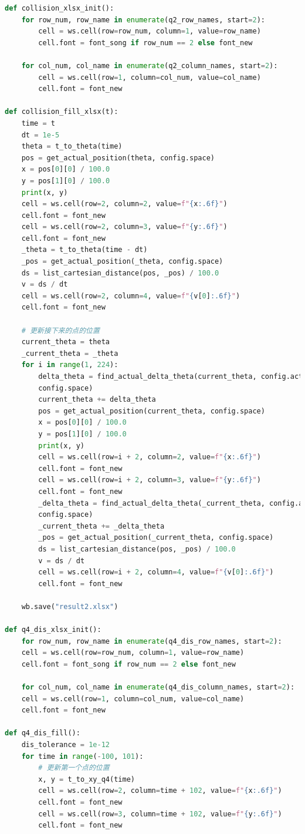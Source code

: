 \documentclass[a4paper]{article}
\begin{document}
\begin{lstlisting}[language=python,columns=fullflexible,frame=shadowbox]
def collision_xlsx_init():
	for row_num, row_name in enumerate(q2_row_names, start=2):
		cell = ws.cell(row=row_num, column=1, value=row_name)
		cell.font = font_song if row_num == 2 else font_new

	for col_num, col_name in enumerate(q2_column_names, start=2):
		cell = ws.cell(row=1, column=col_num, value=col_name)
		cell.font = font_new

def collision_fill_xlsx(t):
	time = t
	dt = 1e-5
	theta = t_to_theta(time)
	pos = get_actual_position(theta, config.space)
	x = pos[0][0] / 100.0
	y = pos[1][0] / 100.0
	print(x, y)
	cell = ws.cell(row=2, column=2, value=f"{x:.6f}")
	cell.font = font_new
	cell = ws.cell(row=2, column=3, value=f"{y:.6f}")
	cell.font = font_new
	_theta = t_to_theta(time - dt)
	_pos = get_actual_position(_theta, config.space)
	ds = list_cartesian_distance(pos, _pos) / 100.0
	v = ds / dt
	cell = ws.cell(row=2, column=4, value=f"{v[0]:.6f}")
	cell.font = font_new

	# 更新接下来的点的位置
	current_theta = theta
	_current_theta = _theta
	for i in range(1, 224):
		delta_theta = find_actual_delta_theta(current_theta, config.actual_fixed_distances[0 if i == 1 else 1],
		config.space)
		current_theta += delta_theta
		pos = get_actual_position(current_theta, config.space)
		x = pos[0][0] / 100.0
		y = pos[1][0] / 100.0
		print(x, y)
		cell = ws.cell(row=i + 2, column=2, value=f"{x:.6f}")
		cell.font = font_new
		cell = ws.cell(row=i + 2, column=3, value=f"{y:.6f}")
		cell.font = font_new
		_delta_theta = find_actual_delta_theta(_current_theta, config.actual_fixed_distances[0 if i == 1 else 1],
		config.space)
		_current_theta += _delta_theta
		_pos = get_actual_position(_current_theta, config.space)
		ds = list_cartesian_distance(pos, _pos) / 100.0
		v = ds / dt
		cell = ws.cell(row=i + 2, column=4, value=f"{v[0]:.6f}")
		cell.font = font_new
		
	wb.save("result2.xlsx")

def q4_dis_xlsx_init():
	for row_num, row_name in enumerate(q4_dis_row_names, start=2):
	cell = ws.cell(row=row_num, column=1, value=row_name)
	cell.font = font_song if row_num == 2 else font_new
	
	for col_num, col_name in enumerate(q4_dis_column_names, start=2):
	cell = ws.cell(row=1, column=col_num, value=col_name)
	cell.font = font_new

def q4_dis_fill():
	dis_tolerance = 1e-12
	for time in range(-100, 101):
		# 更新第一个点的位置
		x, y = t_to_xy_q4(time)
		cell = ws.cell(row=2, column=time + 102, value=f"{x:.6f}")
		cell.font = font_new
		cell = ws.cell(row=3, column=time + 102, value=f"{y:.6f}")
		cell.font = font_new


\end{lstlisting}
\end{document}
